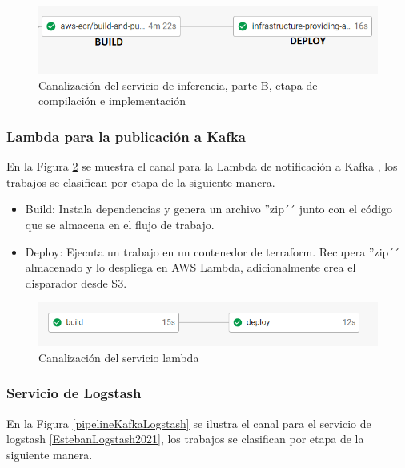\begin{figure}[H]
\centering
\includegraphics[width=0.8\linewidth]{bibliografia/Imagenes/inferencerpipelineB.PNG}
\caption {Canalización del servicio de inferencia, parte B, etapa de compilación e implementación}
\label {pipelineB}
\end {figure}


\subsubsection {Lambda para la publicación a Kafka}


En la Figura \ref{pipelineLambdaProducer} se muestra el canal para la Lambda de notificación a Kafka \cite{EstebanEventProducer2021}, los trabajos se clasifican por etapa de la siguiente manera.

\begin {itemize}
\item Build: Instala dependencias y genera un archivo ''zip´´ junto con el código que se almacena en el flujo de trabajo.
\item Deploy: Ejecuta un trabajo en un contenedor de terraform. Recupera ''zip´´ almacenado y lo despliega en AWS Lambda, adicionalmente crea el disparador desde S3.
\end {itemize}

\begin{figure}[H]
	\centering
	\includegraphics[width=1\linewidth]{bibliografia/Imagenes/lambdaProducerPipeline.PNG}
	\caption {Canalización del servicio lambda}
	\label {pipelineLambdaProducer}
\end {figure}


\subsubsection {Servicio de Logstash}

En la Figura \ref{pipelineKafkaLogstash} se ilustra el canal para el servicio de logstash \ref{EstebanLogstash2021}, los trabajos se clasifican por etapa de la siguiente manera.

